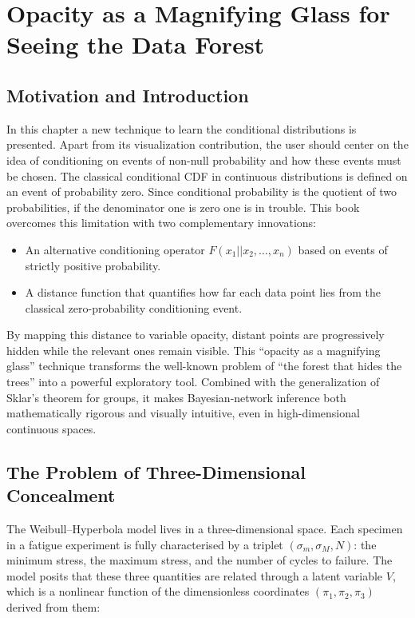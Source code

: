 \startcontents[chapter]
\chapter{Opacity as a Magnifying Glass for Seeing the Data Forest}\label{ch:Opacity}
\minitocboxed

\section*{Motivation and Introduction}
\label{sec:opacity}

In this chapter a new technique to learn the conditional distributions is presented. Apart from its visualization contribution, the user should center on the idea of conditioning on events of non-null probability and how these events must be chosen. The classical conditional CDF in continuous distributions is defined on an event of probability zero. Since conditional probability is the quotient of two probabilities, if the denominator one is zero one is in trouble. This book overcomes this limitation with two complementary innovations:

\begin{itemize}
\item An alternative conditioning operator \(F(x_1 || x_2,\dots,x_n)\) based on events of strictly positive probability.
\item A distance function that quantifies how far each data point lies from the classical zero-probability conditioning event.
\end{itemize}

By mapping this distance to variable opacity, distant points are progressively hidden while the relevant ones remain visible. This ``opacity as a magnifying glass'' technique transforms the well-known problem of ``the forest that hides the trees'' into a powerful exploratory tool. Combined with the generalization of Sklar’s theorem for groups, it makes Bayesian-network inference both mathematically rigorous and visually intuitive, even in high-dimensional continuous spaces.

\section{The Problem of Three-Dimensional Concealment}

The Weibull--Hyperbola model lives in a three-dimensional space. Each specimen in a fatigue experiment is fully characterised by a triplet $(\sigma_m, \sigma_M, N)$: the minimum stress, the maximum stress, and the number of cycles to failure. The model posits that these three quantities are related through a latent variable $V$, which is a nonlinear function of the dimensionless coordinates $(\pi_1, \pi_2, \pi_3)$ derived from them:

